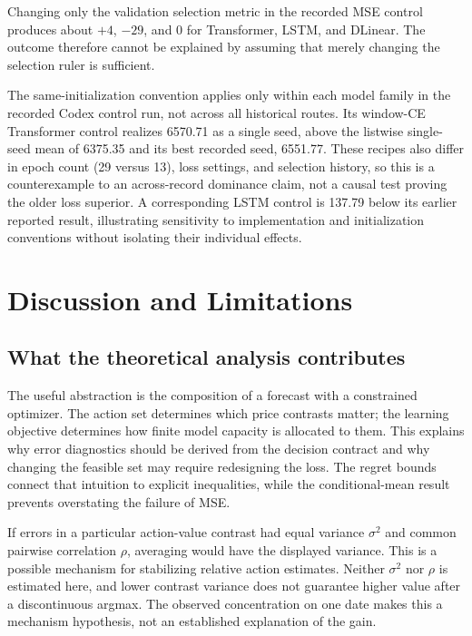\documentclass[11pt,a4paper]{article}
\begin{document}

Changing only the validation selection metric in the recorded MSE control produces about $+4$, $-29$, and $0$ for Transformer, LSTM, and DLinear. The outcome therefore cannot be explained by assuming that merely changing the selection ruler is sufficient.

The same-initialization convention applies only within each model family in the recorded Codex control run, not across all historical routes. Its window-CE Transformer control realizes 6570.71 as a single seed, above the listwise single-seed mean of 6375.35 and its best recorded seed, 6551.77. These recipes also differ in epoch count (29 versus 13), loss settings, and selection history, so this is a counterexample to an across-record dominance claim, not a causal test proving the older loss superior. A corresponding LSTM control is 137.79 below its earlier reported result, illustrating sensitivity to implementation and initialization conventions without isolating their individual effects.
\FloatBarrier

\section{Discussion and Limitations}
\subsection{What the theoretical analysis contributes}
The useful abstraction is the composition of a forecast with a constrained optimizer. The action set determines which price contrasts matter; the learning objective determines how finite model capacity is allocated to them. This explains why error diagnostics should be derived from the decision contract and why changing the feasible set may require redesigning the loss. The regret bounds connect that intuition to explicit inequalities, while the conditional-mean result prevents overstating the failure of MSE.

\EqVariance
If errors in a particular action-value contrast had equal variance $\sigma^2$ and common pairwise correlation $\rho$, averaging would have the displayed variance. This is a possible mechanism for stabilizing relative action estimates. Neither $\sigma^2$ nor $\rho$ is estimated here, and lower contrast variance does not guarantee higher value after a discontinuous argmax. The observed concentration on one date makes this a mechanism hypothesis, not an established explanation of the gain.
\end{document}
